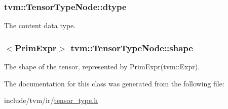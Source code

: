 \subsubsection[{\texorpdfstring{dtype}{dtype}}]{ tvm\+::\+Tensor\+Type\+Node\+::dtype}\hypertarget{classtvm_1_1TensorTypeNode_a715d148ed0f0fdc8bf975bb31e210975}{}\label{classtvm_1_1TensorTypeNode_a715d148ed0f0fdc8bf975bb31e210975}


The content data type. 

\subsubsection[{\texorpdfstring{shape}{shape}}]{$<${\bf Prim\+Expr}$>$ tvm\+::\+Tensor\+Type\+Node\+::shape}\hypertarget{classtvm_1_1TensorTypeNode_a98fa347833e4504dd6f8056d9863a708}{}\label{classtvm_1_1TensorTypeNode_a98fa347833e4504dd6f8056d9863a708}


The shape of the tensor, represented by Prim\+Expr(tvm\+::\+Expr). 



The documentation for this class was generated from the following file\+:\begin{DoxyCompactItemize}
\item 
include/tvm/ir/\hyperlink{tensor__type_8h}{tensor\+\_\+type.\+h}\end{DoxyCompactItemize}
